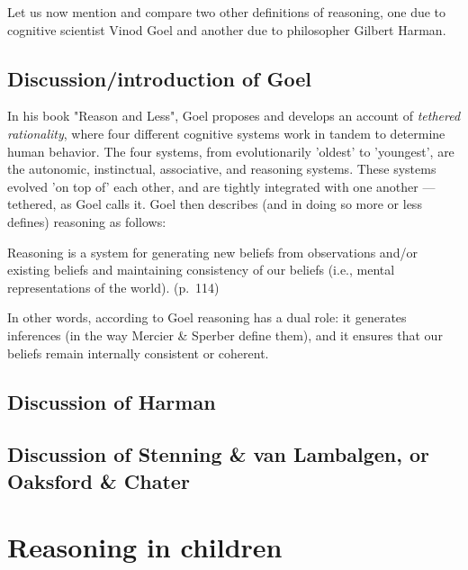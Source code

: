 Let us now mention and compare two other definitions of reasoning, one due to cognitive scientist Vinod Goel and another due to philosopher Gilbert Harman.

\subsection{Discussion/introduction of Goel}
In his \citeyear{Goel22} book "Reason and Less", Goel proposes and develops an account of \emph{tethered rationality}, where four different cognitive systems work in tandem to determine human behavior. The four systems, from evolutionarily 'oldest' to 'youngest', are the autonomic, instinctual, associative, and reasoning systems. These systems evolved 'on top of' each other, and are tightly integrated with one another --- tethered, as Goel calls it.
Goel then describes (and in doing so more or less defines) reasoning as follows:
\begin{quoting}
    Reasoning is a system for generating new beliefs from observations and/or existing beliefs and maintaining consistency of our beliefs (i.e., mental representations of the world).
    \hfill (p.~114)
\end{quoting}
In other words, according to Goel reasoning has a dual role: it generates inferences (in the way Mercier \& Sperber define them), and it ensures that our beliefs remain internally consistent or coherent.
\subsection{Discussion of Harman}
\subsection{Discussion of Stenning \& van Lambalgen, or Oaksford \& Chater}

\section{Reasoning in children}
\label{sec:reasoning-dev}


